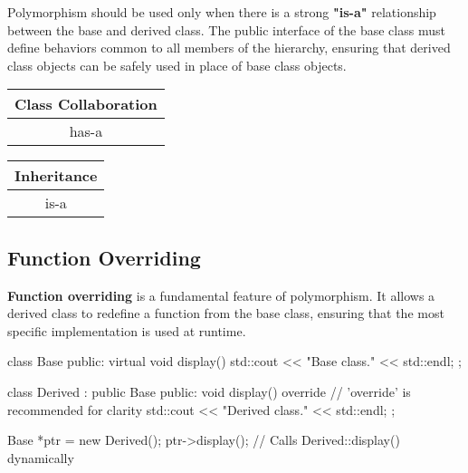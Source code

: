 Polymorphism should be used only when there is a strong \textbf{"is-a"} relationship between the base and derived class. The public interface of the base class must define behaviors common to all members of the hierarchy, ensuring that derived class objects can be safely used in place of base class objects.

\vspace{0.5em}

\begin{center}
\begin{minipage}{0.3\textwidth}
    \centering
    \renewcommand{\arraystretch}{1.2}
    \begin{tabular}{c}
        \textbf{Class Collaboration} \\
        \hline
        has-a \\
    \end{tabular}
\end{minipage}%
\begin{minipage}{0.3\textwidth}
    \centering
    \renewcommand{\arraystretch}{1.2}
    \begin{tabular}{c}
        \textbf{Inheritance} \\
        \hline
        is-a \\
    \end{tabular}
\end{minipage}
\end{center}

\subsection{Function Overriding}

\vspace{-0.5em}

\textbf{Function overriding} is a fundamental feature of polymorphism. It allows a derived class to redefine a function from the base class, ensuring that the most specific implementation is used at runtime.

\vspace{-0.5em}

\begin{codeblock}[language=C++]
class Base {
public:
    virtual void display() {
        std::cout << "Base class." << std::endl;
    }
};

class Derived : public Base {
public:
    void display() override { // 'override' is recommended for clarity
        std::cout << "Derived class." << std::endl;
    }
};

Base *ptr = new Derived();
ptr->display(); // Calls Derived::display() dynamically
\end{codeblock}


